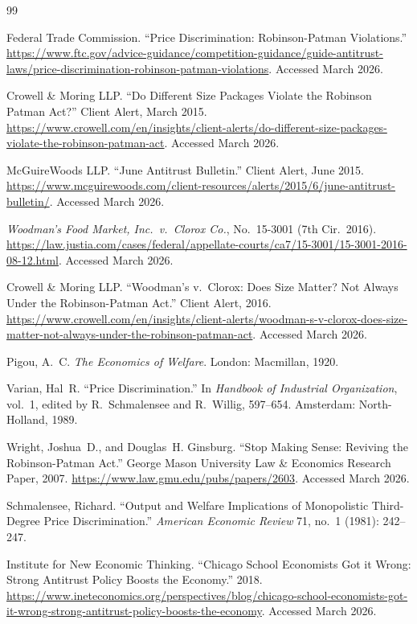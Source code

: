 \documentclass[12pt]{article}
\theoremstyle{definition}
\begin{document}
\newpage
\begin{thebibliography}{99}

Federal Trade Commission.
``Price Discrimination: Robinson-Patman Violations.''
\url{https://www.ftc.gov/advice-guidance/competition-guidance/guide-antitrust-laws/price-discrimination-robinson-patman-violations}. Accessed March 2026.

Crowell \& Moring LLP.
``Do Different Size Packages Violate the Robinson Patman Act?''
Client Alert, March 2015.
\url{https://www.crowell.com/en/insights/client-alerts/do-different-size-packages-violate-the-robinson-patman-act}.
Accessed March 2026.

McGuireWoods LLP.
``June Antitrust Bulletin.''
Client Alert, June 2015.
\url{https://www.mcguirewoods.com/client-resources/alerts/2015/6/june-antitrust-bulletin/}.
Accessed March 2026.

\textit{Woodman's Food Market, Inc.\ v.\ Clorox Co.}, No.\ 15-3001 (7th Cir.\ 2016).
\url{https://law.justia.com/cases/federal/appellate-courts/ca7/15-3001/15-3001-2016-08-12.html}.
Accessed March 2026.

Crowell \& Moring LLP.
``Woodman's v.\ Clorox: Does Size Matter? Not Always Under the Robinson-Patman Act.''
Client Alert, 2016.
\url{https://www.crowell.com/en/insights/client-alerts/woodman-s-v-clorox-does-size-matter-not-always-under-the-robinson-patman-act}.
Accessed March 2026.

Pigou, A.~C.
\textit{The Economics of Welfare}.
London: Macmillan, 1920.

Varian, Hal~R.
``Price Discrimination.''
In \textit{Handbook of Industrial Organization}, vol.~1, edited by R.~Schmalensee and R.~Willig, 597--654.
Amsterdam: North-Holland, 1989.

Wright, Joshua~D., and Douglas~H. Ginsburg.
``Stop Making Sense: Reviving the Robinson-Patman Act.''
George Mason University Law \& Economics Research Paper, 2007.
\url{https://www.law.gmu.edu/pubs/papers/2603}.
Accessed March 2026.

Schmalensee, Richard.
``Output and Welfare Implications of Monopolistic Third-Degree Price Discrimination.''
\textit{American Economic Review} 71, no.~1 (1981): 242--247.

Institute for New Economic Thinking.
``Chicago School Economists Got it Wrong: Strong Antitrust Policy Boosts the Economy.''
2018.
\url{https://www.ineteconomics.org/perspectives/blog/chicago-school-economists-got-it-wrong-strong-antitrust-policy-boosts-the-economy}.
Accessed March 2026.


\end{thebibliography}
\end{document}
